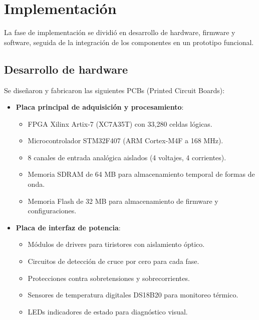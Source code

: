 \documentclass{report}          %
\begin{document}
        \section{Implementación}
            La fase de implementación se dividió en desarrollo de hardware, firmware y software, seguida de la integración de los componentes en un prototipo funcional.
        
            \subsection{Desarrollo de hardware}
                Se diseñaron y fabricaron las siguientes PCBs (Printed Circuit Boards):

                \begin{itemize}
                    \item \textbf{Placa principal de adquisición y procesamiento}:
                        \begin{itemize}
                            \item FPGA Xilinx Artix-7 (XC7A35T) con 33,280 celdas lógicas.
                            \item Microcontrolador STM32F407 (ARM Cortex-M4F a 168 MHz).
                            \item 8 canales de entrada analógica aislados (4 voltajes, 4 corrientes).
                            \item Memoria SDRAM de 64 MB para almacenamiento temporal de formas de onda.
                            \item Memoria Flash de 32 MB para almacenamiento de firmware y configuraciones.
                        \end{itemize}

                    \item \textbf{Placa de interfaz de potencia}:
                        \begin{itemize}
                            \item Módulos de drivers para tiristores con aislamiento óptico.
                            \item Circuitos de detección de cruce por cero para cada fase.
                            \item Protecciones contra sobretensiones y sobrecorrientes.
                            \item Sensores de temperatura digitales DS18B20 para monitoreo térmico.
                            \item LEDs indicadores de estado para diagnóstico visual.
                        \end{itemize}
                    

\end{itemize}
\end{document}
